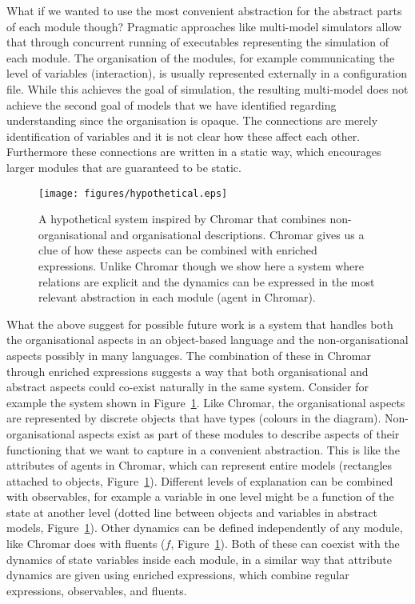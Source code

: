What if we wanted to use the most convenient abstraction for the abstract parts
of each module though? Pragmatic approaches like multi-model simulators
\citep{erbm_mois_2015, cis_2018} allow that through concurrent running of
executables representing the simulation of each module. The organisation of the
modules, for example communicating the level of variables (interaction), is
usually represented externally in a configuration file. While this achieves the
goal of simulation, the resulting multi-model does not achieve the second goal
of models that we have identified regarding understanding since the organisation
is opaque. The connections are merely identification of variables and it is not
clear how these affect each other. Furthermore these connections are written in
a static way, which encourages larger modules that are guaranteed to be static.

\begin{figure}[tb]
  \centering
  \texttt{[image: figures/hypothetical.eps]}
  \caption{A hypothetical system inspired by Chromar that combines
    non-organisational and organisational descriptions. Chromar gives us a clue
    of how these aspects can be combined with enriched expressions. Unlike
    Chromar though we show here a system where relations are explicit and the
    dynamics can be expressed in the most relevant abstraction in each module
    (agent in Chromar).}
    \label{fig:hyp}
\end{figure}

What the above suggest for possible future work is a system that handles both
the organisational aspects in an object-based language and the
non-organisational aspects possibly in many languages. The combination of these
in Chromar through enriched expressions suggests a way that both organisational
and abstract aspects could co-exist naturally in the same system. Consider for
example the system shown in Figure~\ref{fig:hyp}. Like Chromar, the
organisational aspects are represented by discrete objects that have types
(colours in the diagram). Non-organisational aspects exist as part of these
modules to describe aspects of their functioning that we want to capture in a
convenient abstraction. This is like the attributes of agents in Chromar, which
can represent entire models (rectangles attached to objects,
Figure~\ref{fig:hyp}). Different levels of explanation can be combined with
observables, for example a variable in one level might be a function of the
state at another level (dotted line between objects and variables in abstract
models, Figure~\ref{fig:hyp}). Other dynamics can be defined independently of
any module, like Chromar does with fluents ($f$, Figure~\ref{fig:hyp}). Both of
these can coexist with the dynamics of state variables inside each module, in a
similar way that attribute dynamics are given using enriched expressions, which
combine regular expressions, observables, and fluents.

